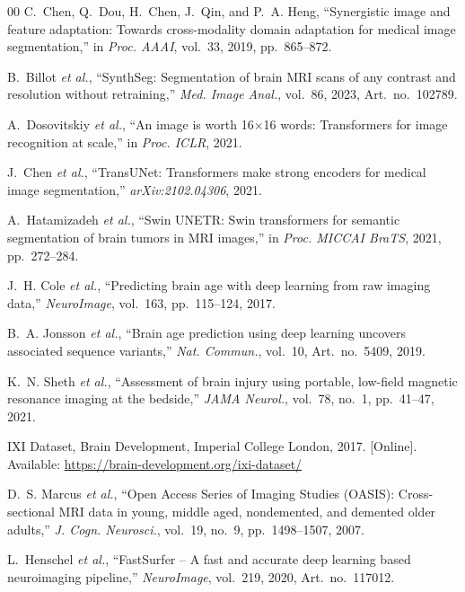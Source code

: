 \documentclass{ieeeaccess}
\begin{document}
\begin{thebibliography}{00}
C.~Chen, Q.~Dou, H.~Chen, J.~Qin, and P.~A. Heng,
``Synergistic image and feature adaptation: Towards cross-modality
domain adaptation for medical image segmentation,''
in \emph{Proc. AAAI}, vol.~33, 2019, pp.~865--872.

B.~Billot \emph{et al.},
``SynthSeg: Segmentation of brain MRI scans of any contrast and
resolution without retraining,''
\emph{Med. Image Anal.}, vol.~86, 2023, Art.~no.~102789.

A.~Dosovitskiy \emph{et al.},
``An image is worth 16$\times$16 words: Transformers for image
recognition at scale,''
in \emph{Proc. ICLR}, 2021.

J.~Chen \emph{et al.},
``TransUNet: Transformers make strong encoders for medical image
segmentation,''
\emph{arXiv:2102.04306}, 2021.

A.~Hatamizadeh \emph{et al.},
``Swin UNETR: Swin transformers for semantic segmentation of brain
tumors in MRI images,''
in \emph{Proc. MICCAI BraTS}, 2021, pp.~272--284.

J.~H. Cole \emph{et al.},
``Predicting brain age with deep learning from raw imaging data,''
\emph{NeuroImage}, vol.~163, pp.~115--124, 2017.

B.~A. Jonsson \emph{et al.},
``Brain age prediction using deep learning uncovers associated
sequence variants,''
\emph{Nat. Commun.}, vol.~10, Art.~no.~5409, 2019.

K.~N. Sheth \emph{et al.},
``Assessment of brain injury using portable, low-field magnetic resonance
imaging at the bedside,''
\emph{JAMA Neurol.}, vol.~78, no.~1, pp.~41--47, 2021.

IXI Dataset, Brain Development, Imperial College London, 2017.
[Online]. Available: \url{https://brain-development.org/ixi-dataset/}

D.~S. Marcus \emph{et al.},
``Open Access Series of Imaging Studies (OASIS): Cross-sectional MRI
data in young, middle aged, nondemented, and demented older adults,''
\emph{J. Cogn. Neurosci.}, vol.~19, no.~9, pp.~1498--1507, 2007.

L.~Henschel \emph{et al.},
``FastSurfer -- A fast and accurate deep learning based neuroimaging
pipeline,''
\emph{NeuroImage}, vol.~219, 2020, Art.~no.~117012.


\end{thebibliography}
\end{document}
